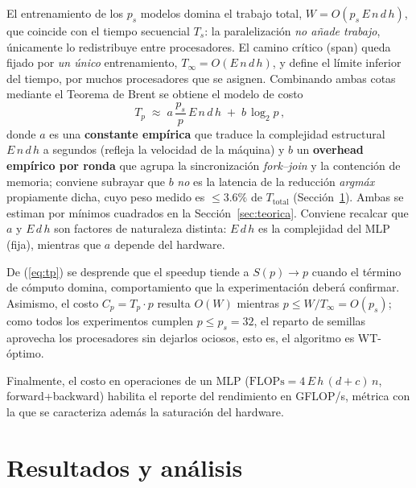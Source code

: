 \documentclass[11pt,a4paper]{article}
\begin{document}
El entrenamiento de los $p_s$ modelos domina el trabajo total,
$W = O(p_s\,E\,n\,d\,h)$, que coincide con el tiempo secuencial $T_s$: la
paralelización \emph{no añade trabajo}, únicamente lo redistribuye entre
procesadores. El camino crítico (span) queda fijado por \emph{un único}
entrenamiento, $T_\infty = O(E\,n\,d\,h)$, y define el límite inferior del tiempo,
por muchos procesadores que se asignen. Combinando ambas cotas mediante el
Teorema de Brent se obtiene el modelo de costo
\begin{equation}\label{eq:tp}
\boxed{\,T_p \;\approx\; a\,\frac{p_s}{p}\,E\,n\,d\,h \;+\; b\,\log_2 p\,,}
\end{equation}
donde $a$ es una \textbf{constante empírica} que traduce la complejidad
estructural $E\,n\,d\,h$ a segundos (refleja la velocidad de la máquina) y $b$ un
\textbf{overhead empírico por ronda} que agrupa la sincronización \emph{fork--join}
y la contención de memoria; conviene subrayar que $b$ \emph{no} es la latencia de
la reducción \emph{arg\-máx} propiamente dicha, cuyo peso medido es $\le 3.6\%$ de
$T_{\text{total}}$ (Sección~\ref{sec:resultados}). Ambas se estiman
por mínimos cuadrados en la Sección~\ref{sec:teorica}. Conviene recalcar que
$a$ y $E\,d\,h$ son factores de naturaleza distinta: $E\,d\,h$ es la complejidad
del MLP (fija), mientras que $a$ depende del hardware.

De (\ref{eq:tp}) se desprende que el speedup tiende a $S(p)\to p$ cuando el
término de cómputo domina, comportamiento que la experimentación deberá
confirmar. Asimismo, el costo $C_p = T_p\cdot p$ resulta $O(W)$ mientras
$p \le W/T_\infty = O(p_s)$; como todos los experimentos cumplen $p\le p_s=32$,
el reparto de semillas aprovecha los procesadores sin dejarlos ociosos, esto es,
el algoritmo es WT-óptimo.

Finalmente, el costo en operaciones de un MLP
($\mathrm{FLOPs}=4\,E\,h\,(d+c)\,n$, forward+backward) habilita el reporte del
rendimiento en GFLOP/s, métrica con la que se caracteriza además la saturación
del hardware.

\section{Resultados y análisis}
\label{sec:resultados}
\end{document}
